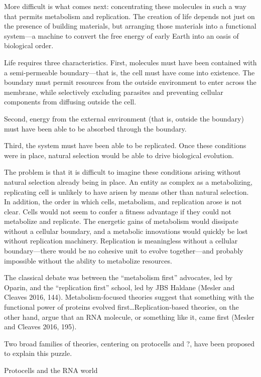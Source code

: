 \documentclass{tufte-book} %
\begin{document}
More difficult is what comes next: concentrating these molecules in such a way that permits metabolism and replication. The creation of life depends not just on the presence of building materials, but arranging those materials into a functional system—a machine to convert the free energy of early Earth into an oasis of biological order.  

Life requires three characteristics. First, molecules must have been contained with a semi-permeable boundary—that is, the cell must have come into existence. The boundary must permit resources from the outside environment to enter across the membrane, while selectively excluding parasites and preventing cellular components from diffusing outside the cell. 

Second, energy from the external environment (that is, outside the boundary) must have been able to be absorbed through the boundary.

Third, the system must have been able to be replicated. Once these conditions were in place, natural selection would be able to drive biological evolution. 

The problem is that it is difficult to imagine these conditions arising without natural selection already being in place. An entity as complex as a metabolizing, replicating cell is unlikely to have arisen by means other than natural selection. In addition, the order in which cells, metabolism, and replication arose is not clear. Cells would not seem to confer a fitness advantage if they could not metabolize and replicate. The energetic gains of metabolism would dissipate without a cellular boundary, and a metabolic innovations would quickly be lost without replication machinery. Replication is meaningless without a cellular boundary—there would be no cohesive unit to evolve together—and probably impossible without the ability to metabolize resources.

The classical debate was between the “metabolism first” advocates, led by Oparin, and the “replication first” school, led by JBS Haldane (Mesler and Cleaves 2016, 144). Metabolism-focused theories suggest that something with the functional power of proteins evolved first…Replication-based theories, on the other hand, argue that an RNA molecule, or something like it, came first (Mesler and Cleaves 2016, 195). 

Two broad families of theories, centering on protocells and ?, have been proposed to explain this puzzle.

Protocells and the RNA world
\end{document}
